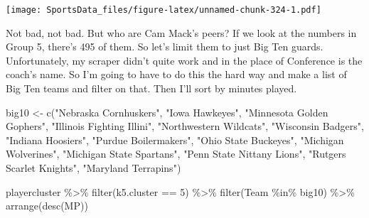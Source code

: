 \documentclass[
]{book}
\newenvironment{Shaded}{\begin{snugshade}}{\end{snugshade}}
\newcommand{\DecValTok}[1]{\textcolor[rgb]{0.00,0.00,0.81}{#1}}
\newcommand{\FunctionTok}[1]{\textcolor[rgb]{0.00,0.00,0.00}{#1}}
\newcommand{\NormalTok}[1]{#1}
\newcommand{\OtherTok}[1]{\textcolor[rgb]{0.56,0.35,0.01}{#1}}
\newcommand{\SpecialCharTok}[1]{\textcolor[rgb]{0.00,0.00,0.00}{#1}}
\newcommand{\StringTok}[1]{\textcolor[rgb]{0.31,0.60,0.02}{#1}}
\begin{document}
\texttt{[image: SportsData\_files/figure-latex/unnamed-chunk-324-1.pdf]}

Not bad, not bad. But who are Cam Mack's peers? If we look at the numbers in Group 5, there's 495 of them. So let's limit them to just Big Ten guards. Unfortunately, my scraper didn't quite work and in the place of Conference is the coach's name. So I'm going to have to do this the hard way and make a list of Big Ten teams and filter on that. Then I'll sort by minutes played.

\begin{Shaded}
\begin{Highlighting}[]
\NormalTok{big10 }\OtherTok{\textless{}{-}} \FunctionTok{c}\NormalTok{(}\StringTok{"Nebraska Cornhuskers"}\NormalTok{, }\StringTok{"Iowa Hawkeyes"}\NormalTok{, }\StringTok{"Minnesota Golden Gophers"}\NormalTok{, }\StringTok{"Illinois Fighting Illini"}\NormalTok{, }\StringTok{"Northwestern Wildcats"}\NormalTok{, }\StringTok{"Wisconsin Badgers"}\NormalTok{, }\StringTok{"Indiana Hoosiers"}\NormalTok{, }\StringTok{"Purdue Boilermakers"}\NormalTok{, }\StringTok{"Ohio State Buckeyes"}\NormalTok{, }\StringTok{"Michigan Wolverines"}\NormalTok{, }\StringTok{"Michigan State Spartans"}\NormalTok{, }\StringTok{"Penn State Nittany Lions"}\NormalTok{, }\StringTok{"Rutgers Scarlet Knights"}\NormalTok{, }\StringTok{"Maryland Terrapins"}\NormalTok{)}

\NormalTok{playercluster }\SpecialCharTok{\%\textgreater{}\%} \FunctionTok{filter}\NormalTok{(k5.cluster }\SpecialCharTok{==} \DecValTok{5}\NormalTok{) }\SpecialCharTok{\%\textgreater{}\%} \FunctionTok{filter}\NormalTok{(Team }\SpecialCharTok{\%in\%}\NormalTok{ big10) }\SpecialCharTok{\%\textgreater{}\%} \FunctionTok{arrange}\NormalTok{(}\FunctionTok{desc}\NormalTok{(MP))}
\end{Highlighting}
\end{Shaded}
\end{document}
